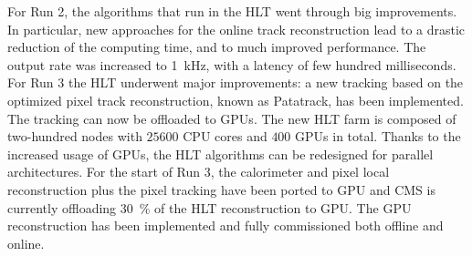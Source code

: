 For Run 2, the algorithms that run in the HLT went through big improvements. In particular, new approaches for the online track reconstruction lead to a drastic reduction of the computing time, and to much improved performance. The output rate was increased to \SI{1}{\kilo\hertz}, with a latency of few hundred milliseconds.
For Run 3 the HLT underwent major improvements: a new tracking based on the optimized pixel track reconstruction, known as Patatrack, has been implemented. The tracking can now be offloaded to GPUs. The new HLT farm is composed of two-hundred nodes with $25600$ CPU cores and $400$ GPUs in total. Thanks to the increased usage of GPUs, the HLT algorithms can be redesigned for parallel architectures. For the start of Run 3, the calorimeter and pixel local reconstruction plus the pixel tracking have been ported to GPU and CMS is currently offloading \SI{30}{\percent} of the HLT reconstruction to GPU. The GPU reconstruction has been implemented and fully commissioned both offline and online.

